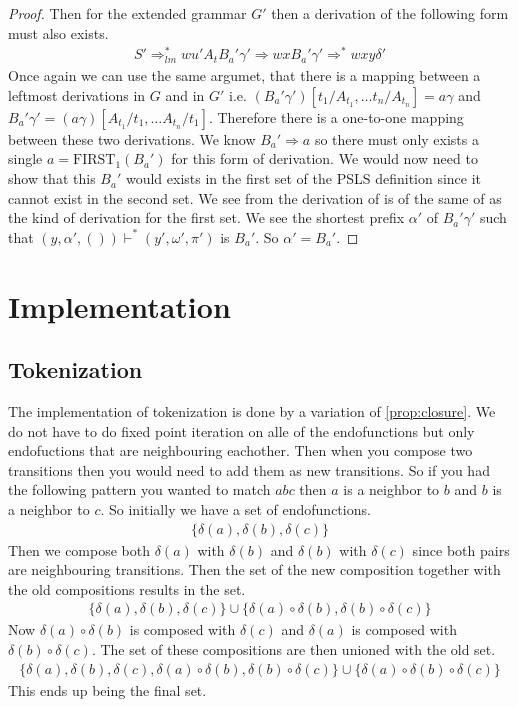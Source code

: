 \documentclass[a4paper,12pt]{article}
\theoremstyle{definition}
\begin{document}
\begin{proof}
  Then for the extended grammar $G'$ then a derivation of the following form must also exists.
  \begin{align*}
    S' \Rightarrow^*_{lm} wu'A_tB_a'\gamma' \Rightarrow wxB_a'\gamma' \Rightarrow^* wxy\delta'
  \end{align*}
  Once again we can use the same argumet, that there is a mapping between a leftmost derivations in $G$ and in $G'$ i.e. $(B_a'\gamma')[t_1/A_{t_1}, \dots t_n/A_{t_n}] = a\gamma$ and $B_a'\gamma' = (a\gamma)[A_{t_1}/t_1, \dots A_{t_n}/t_1]$. Therefore there is a one-to-one mapping between these two derivations. We know $B_a' \Rightarrow a$ so there must only exists a single $a = \text{FIRST}_1(B_a')$ for this form of derivation. We would now need to show that this $B_a'$ would exists in the first set of the PSLS definition since it cannot exist in the second set. We see from the derivation of is of the same of as the kind of derivation for the first set. We see the shortest prefix $\alpha'$ of $B_a'\gamma'$ such that $(y, \alpha', ()) \vdash^* (y', \omega', \pi')$ is $B_a'$. So $\alpha' = B_a'$.
\end{proof}

\section{Implementation}
\subsection{Tokenization}
The implementation of tokenization is done by a variation of \ref{prop:closure}. We do not have to do fixed point iteration on alle of the endofunctions but only endofuctions that are neighbouring eachother. Then when you compose two transitions then you would need to add them as new transitions. So if you had the following pattern you wanted to match $abc$ then $a$ is a neighbor to $b$ and $b$ is a neighbor to $c$. So initially we have a set of endofunctions.
\begin{align*}
  \{\delta(a), \delta(b), \delta(c)\}
\end{align*}
Then we compose both $\delta(a)$ with $\delta(b)$ and $\delta(b)$ with $\delta(c)$ since both pairs are neighbouring transitions. Then the set of the new composition together with the old compositions results in the set.
\begin{align*}
  \{\delta(a), \delta(b), \delta(c)\} \cup \{\delta(a) \circ \delta(b), \delta(b) \circ \delta(c)\}
\end{align*}
Now $\delta(a) \circ \delta(b)$ is composed with $\delta(c)$ and $\delta(a)$ is composed with $\delta(b) \circ \delta(c)$. The set of these compositions are then unioned with the old set.
\begin{align*}
  \{\delta(a), \delta(b), \delta(c), \delta(a) \circ \delta(b), \delta(b) \circ \delta(c)\} \cup \{\delta(a) \circ \delta(b) \circ \delta(c)\}
\end{align*}
This ends up being the final set.
\end{document}
